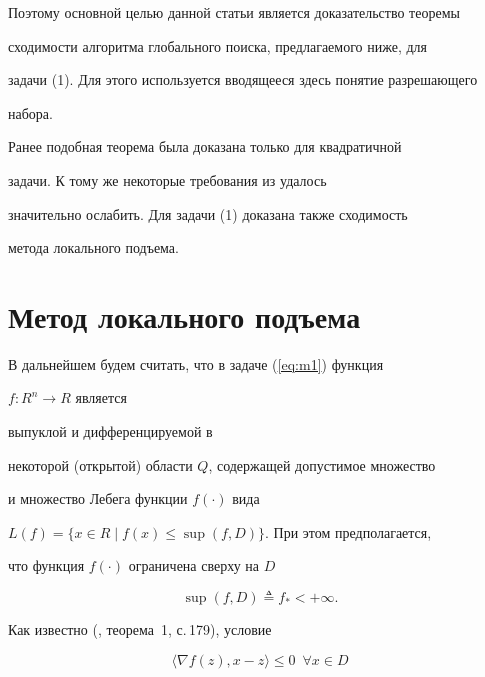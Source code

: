 Поэтому основной целью данной статьи является доказательство теоремы


сходимости алгоритма глобального поиска, предлагаемого ниже, для


задачи (1). Для этого используется вводящееся здесь понятие разрешающего


набора.


Ранее \cite{l7} подобная теорема была доказана только для квадратичной 


задачи. К тому же некоторые требования из \cite{l7} удалось


значительно ослабить. Для задачи (1) доказана также сходимость


метода локального подъема.





\section{Метод локального подъема}





В дальнейшем будем считать, что в задаче (\ref{eq:m1}) функция


$f:R^{n}\rightarrow R$ является 


выпуклой и дифференцируемой в 


некоторой (открытой) области $Q$, содержащей допустимое множество


и множество Лебега функции $f(\cdot)$ вида


$L(f)=\{x\in R \mid f(x)\leq \sup(f,D) \}$. При этом предполагается,


что функция $f(\cdot)$ ограничена сверху на $D$


\begin{equation}


\sup (f,D)\triangleq f_{*}<+\infty.


\label{eq:m2}


\end{equation}


Как известно (\cite{l2}, теорема~1, с.\,179), условие 


\begin{equation}


\langle \nabla f(z), x-z \rangle \leq 0 \ \; \forall x \in D 


\label{eq:m3}


\end{equation}



